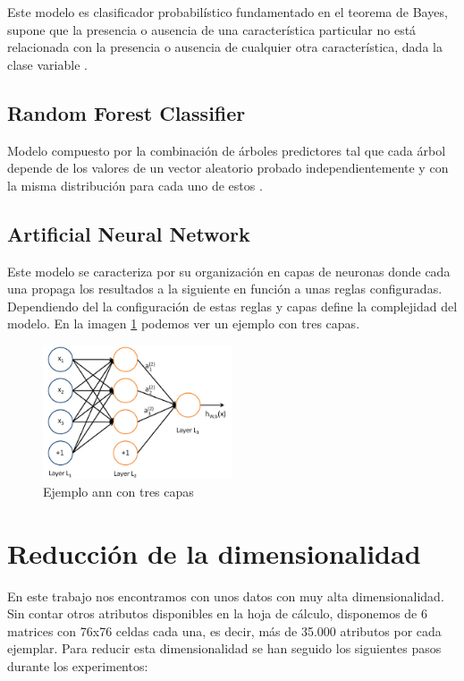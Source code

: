 Este modelo es clasificador probabilístico fundamentado en el teorema de Bayes,  supone que la presencia o ausencia de una característica particular no está relacionada con la presencia o ausencia de cualquier otra característica, dada la clase variable \cite{de:NaiveClassifier}. 

\subsection{Random Forest Classifier}
Modelo compuesto por la combinación de árboles predictores tal que cada árbol depende de los valores de un vector aleatorio probado independientemente y con la misma distribución para cada uno de estos \cite{Breiman2001RandomForests}. 

\subsection{Artificial Neural Network}
Este modelo se caracteriza por su organización en capas de neuronas donde cada una
propaga los resultados a la siguiente en función a unas reglas configuradas. Dependiendo del la configuración de estas reglas y capas define la complejidad del modelo. En la imagen \ref{figure:ann} podemos ver un ejemplo con tres capas.

\begin{figure}[H]
\centering
\includegraphics[width=0.5\textwidth]{figs/algorimos/ann.png}
\caption{Ejemplo \gls{ann} con tres capas}
\label{figure:ann}
\end{figure}

\section{Reducción de la dimensionalidad}

En este trabajo nos encontramos con unos datos con muy alta dimensionalidad. Sin contar otros atributos disponibles en la hoja de cálculo, disponemos de 6 matrices con 76x76 celdas cada una, es decir, más de 35.000 atributos por cada ejemplar. Para reducir esta dimensionalidad se han seguido los siguientes pasos durante los experimentos:

